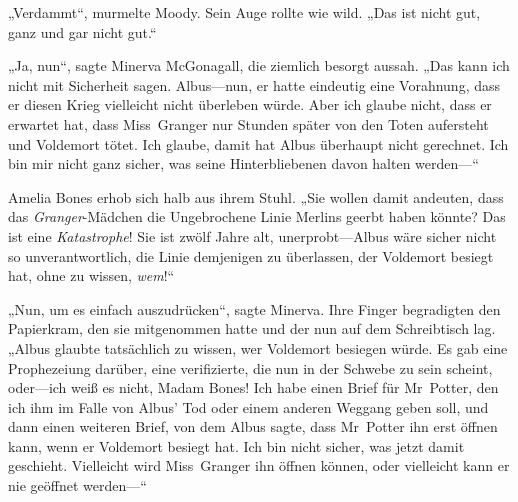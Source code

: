 „Verdammt“, murmelte Moody. Sein Auge rollte wie wild. „Das ist nicht gut, ganz und gar nicht gut.“

„Ja, nun“, sagte Minerva McGonagall, die ziemlich besorgt aussah. „Das kann ich nicht mit Sicherheit sagen. Albus—nun, er hatte eindeutig eine Vorahnung, dass er diesen Krieg vielleicht nicht überleben würde. Aber ich glaube nicht, dass er erwartet hat, dass Miss~Granger nur Stunden später von den Toten aufersteht und Voldemort tötet. Ich glaube, damit hat Albus überhaupt nicht gerechnet. Ich bin mir nicht ganz sicher, was seine Hinterbliebenen davon halten werden—“

Amelia Bones erhob sich halb aus ihrem Stuhl.
„Sie wollen damit andeuten, dass das \emph{Granger}-Mädchen die Ungebrochene Linie Merlins geerbt haben könnte? Das ist eine \emph{Katastrophe}! Sie ist zwölf Jahre alt, unerprobt—Albus wäre sicher nicht so unverantwortlich, die Linie demjenigen zu überlassen, der Voldemort besiegt hat, ohne zu wissen, \emph{wem}!“

„Nun, um es einfach auszudrücken“, sagte Minerva. Ihre Finger begradigten den Papierkram, den sie mitgenommen hatte und der nun auf dem Schreibtisch lag. „Albus glaubte tatsächlich zu wissen, wer Voldemort besiegen würde. Es gab eine Prophezeiung darüber, eine verifizierte, die nun in der Schwebe zu sein scheint, oder—ich weiß es nicht, Madam Bones! Ich habe einen Brief für Mr~Potter, den ich ihm im Falle von Albus’ Tod oder einem anderen Weggang geben soll, und dann einen weiteren Brief, von dem Albus sagte, dass Mr~Potter ihn erst öffnen kann, wenn er Voldemort besiegt hat. Ich bin nicht sicher, was jetzt damit geschieht. Vielleicht wird Miss~Granger ihn öffnen können, oder vielleicht kann er nie geöffnet werden—“

